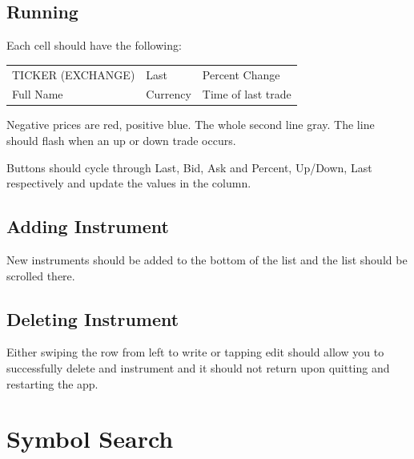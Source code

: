 \documentclass[12pt,twoside,letterpaper]{report}
\begin{document}
\subsection*{Running}
Each cell should have the following:

\begin{tabular}{ l l l }
\hline
TICKER (EXCHANGE) & Last & Percent Change \\
Full Name & Currency & Time of last trade \\
\hline
\end{tabular}

Negative prices are red, positive blue. The whole second line gray. The line should flash when an up or down trade occurs.

Buttons should cycle through Last, Bid, Ask and Percent, Up/Down, Last respectively and update the values in the column.

\subsection*{Adding Instrument}
New instruments should be added to the bottom of the list and the list should be scrolled there.

\subsection*{Deleting Instrument}
Either swiping the row from left to write or tapping edit should allow you to successfully delete and instrument and it should not return upon quitting and restarting the app.

\section*{Symbol Search}
\end{document}

